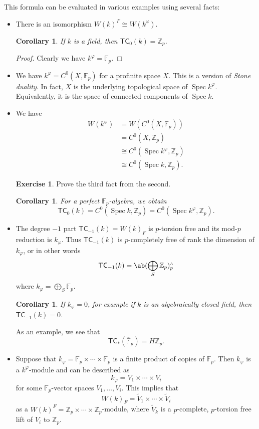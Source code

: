 \documentclass[10pt, oneside]{memoir}
\newtheorem{cor}[thm]{Corollary}
\theoremstyle{definition}
\newtheorem{exer}[thm]{Exercise}
\theoremstyle{remark}
\theoremstyle{plain}
\theoremstyle{definition}
\theoremstyle{remark}
\newcommand{\Z}{\mathbb{Z}}
\newcommand{\F}{\mathbb{F}}
\newcommand{\ms}[1]{\mathsf{#1}}
\newcommand{\ol}[1]{\overline{#1}}
\newcommand{\1}{\mathbf{1}}
\newcommand{\2}{\mathbf{2}}
\newcommand{\3}{\mathbf{3}}
\newcommand{\TC}{\ms{TC}}
\newcommand{\sw}{\mathsmaller{\wedge}}
\DeclareMathOperator{\Spec}{Spec}
\begin{document}
This formula can be evaluated in various examples using several facts:

\begin{itemize}
    \item There is an isomorphism $W(k)^F \cong W(k^{\varphi})$.
    \begin{cor}
        If $k$ is a field, then $\TC_0(k) = \Z_p$.
    \end{cor}
    
    \begin{proof}
        Clearly we have $k^{\varphi} = \F_p$.
    \end{proof}
    \item We have $k^{\varphi} = C^0(X, \F_p)$ for a profinite space \(X\). This is a version of \textit{Stone duality}. In fact, $X$ is the underlying topological space of $\Spec k^{\varphi}$. Equivalently, it is the space of connected components of $\Spec k$.
    \item We have
    \begin{align*}
        W(k^{\varphi}) &= W(C^0(X, \F_p)) \\
        &= C^0(X, \Z_p) \\
        &\cong C^0(\Spec k^{\varphi}, \Z_p) \\
        &\cong C^0(\Spec k, \Z_p).
    \end{align*}
    \begin{exer}
        Prove the third fact from the second.
    \end{exer}
    \begin{cor}
        For a perfect $\F_p$-algebra, we obtain
        \[ \TC_0(k) = C^0(\Spec k, \Z_p) = C^0(\Spec k^{\varphi}, \Z_p). \]
    \end{cor}
    \item The degree $-1$ part $\TC_{-1}(k) = W(k)_F$ is $p$-torsion free and its mod-$p$ reduction is $k_{\varphi}$. Thus $\TC_{-1}(k)$ is $p$-completely free of rank the dimension of $k_{\varphi}$, or in other words
    \[ \TC_{-1}(k) = \ab(\bigoplus_S \Z_p)_p^{\sw} \]
    where $k_{\varphi} = \bigoplus_S \F_p$.
    \begin{cor}
        If $k_{\varphi} = 0$, for example if $k$ is an algebraically closed field, then $\TC_{-1}(k) = 0$.
    \end{cor}
    As an example, we see that
    \[ \TC_*(\ol{\F}_p) = H\Z_p. \]
    \item Suppose that $k_{\varphi} = \F_p \times \cdots \times \F_p$ is a finite product of copies of $\F_p$. Then $k_{\varphi}$ is a $k^{\varphi}$-module and can be described as
    \[ k_{\varphi} = V_1 \times \cdots \times V_i \]
    for some $\F_p$-vector spaces $V_1, \ldots, V_i$. This implies that
    \[ W(k)_F = \tilde{V}_1 \times \cdots \times \tilde{V}_i \]
    as a $W(k)^F = \Z_p \times \cdots \times \Z_p$-module, where $\tilde{V}_k$ is a $p$-complete, $p$-torsion free lift of $V_i$ to $\Z_p$.
\end{itemize}
\end{document}
